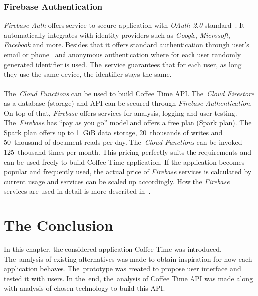 \subsubsection{Firebase Authentication}
\textit{Firebase Auth} offers service to secure application with \textit{OAuth~2.0} standard~\cite{oauth}. It automatically integrates with identity providers such as \textit{Google}, \textit{Microsoft}, \textit{Facebook} and more. Besides that it offers standard authentication through user's email or phone~\cite{cloud-auth} and anonymous authentication where for each user randomly generated identifier is used. The~service guarantees that for each user, as long they use the same device, the identifier stays the same. 
\\
\\
The~\textit{Cloud Functions} can be used to build Coffee Time API. The~\textit{Cloud Firestore} as a database (storage) and API can be secured through \textit{Firebase Authentication}. On top of that, \textit{Firebase} offers services for analysis, logging and user testing. The~\textit{Firebase} has ``pay as you go'' model and offers a free plan (Spark plan). The Spark plan offers up to 1~GiB data storage, 20~thousands of writes and 50~thousand of document reads per day. The~\textit{Cloud Functions} can be invoked 125~thousand times per month. This pricing perfectly suits the requirements and can be used freely to build Coffee Time application. If the application becomes popular and frequently used, the actual price of \textit{Firebase} services is calculated by current usage and services can be scaled up accordingly. How the \textit{Firebase} services are used in detail is more described in~. 

\section{The Conclusion}
In this chapter, the considered application Coffee Time was introduced. The~analysis of existing alternatives was made to obtain inspiration for how each application behaves. The~prototype was created to propose user interface and tested it with users. In the~end, the~analysis of Coffee Time API was made along with analysis of chosen technology to build this API.